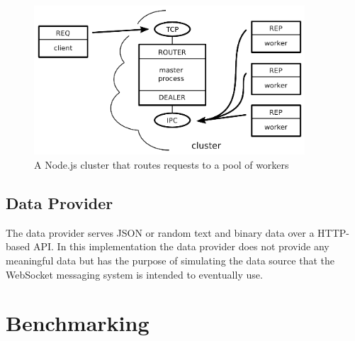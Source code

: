 \begin{figure}[h!]
	\centering
	\label{fig:webSocketMessagingSystem}\includegraphics[width=0.9\textwidth]{images/poolOfWorkers}
	\caption{A Node.js cluster that routes requests to a pool of workers \cite{judd2008node}}
\end{figure}

\subsection{Data Provider}

The data provider serves JSON or random text and binary data over a HTTP-based API. In this implementation the data provider does not provide any meaningful data but has the purpose of simulating the data source that the WebSocket messaging system is intended to eventually use.

\section{Benchmarking}

